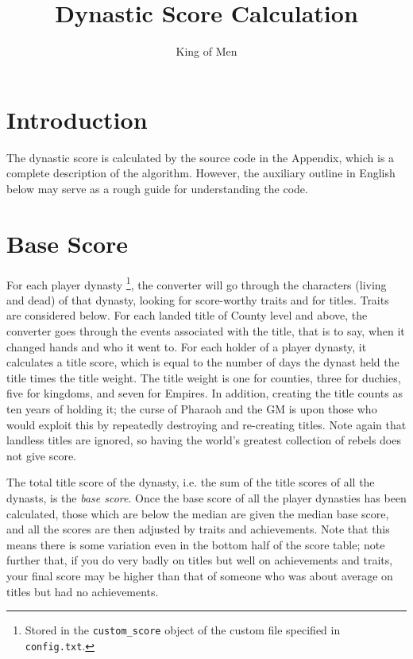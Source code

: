 \documentclass[12pt]{article}
\title{Dynastic Score Calculation}
\author{King of Men}
\begin{document}
\maketitle

\section{Introduction}

The dynastic score is calculated by the source code in the Appendix,
which is a complete description of the algorithm. However, the
auxiliary outline in English below may serve as a rough guide for
understanding the code.

\section{Base Score}

For each player dynasty \footnote{Stored in the \texttt{custom\_score} object of
the custom file specified in \texttt{config.txt}.}, the converter will
go through the characters (living and dead) of that dynasty, looking
for score-worthy traits and for titles. Traits are considered below.
For each landed title of County level and above, the converter goes
through the events associated with the title, that is to say, when it
changed hands and who it went to. For each holder of a player dynasty,
it calculates a title score, which is equal to the number of days the
dynast held the title times the title weight. The title weight is one for
counties, three for duchies, five for kingdoms, and seven for
Empires. In addition, creating the title counts as ten years of
holding it; the curse of Pharaoh and the GM is upon those who
would exploit this by repeatedly destroying and re-creating
titles. Note again that landless titles are ignored, so having the
world's greatest collection of rebels does not give score.

The total title score of the dynasty, i.e. the sum of the title scores
of all the dynasts, is the \emph{base score}. Once the base score of
all the player dynasties has been calculated, those which are below
the median are given the median base score, and all the scores are
then adjusted by traits and achievements. Note that this means there
is some variation even in the bottom half of the score table; note
further that, if you do very badly on titles but well on achievements
and traits, your final score may be higher than that of someone who
was about average on titles but had no achievements.
\end{document}

